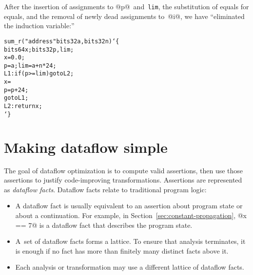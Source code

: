 \documentclass[blockstyle,preprint,natbib,nocopyrightspace]{sigplanconf}
\newcommand\lbr{\char`\{}
\newcommand\rbr{\char`\}}
\newcommand\secref[1]{Section~\ref{sec:#1}}
\newcommand\seclabel[1]{\label{sec:#1}}
\begin{document}
After the insertion of assignments to @p@~and~\texttt{lim}, the substitution
of equals for equals, and the removal of newly dead assignments
to~@i@, we have ``eliminated the induction variable:''
\begin{alltt}
sum_r("address" bits32 a, bits32 n) \lbr
     bits64 x; bits32 p, lim;
     x = 0.0;
     p = a; lim = a + n * 24;
 L1: if ({p >= lim}) goto L2;
     x = %fadd(x, bits64[{p}]);
     p = p + 24;
     goto L1;
 L2: return x;
\rbr
\end{alltt}

  


\section {Making dataflow simple}

\seclabel{making-simple}

\seclabel{create-analysis}

The goal of dataflow optimization is to compute valid
assertions, then use those assertions to justify code-improving
transformations.
%
%
Assertions are represented as
\emph{dataflow facts}.
Dataflow facts relate to
 traditional 
program logic:
\begin{itemize}
\item
A dataflow fact is usually equivalent to an assertion about program state or
about a continuation.
For example, in \secref{constant-propagation}, @x == 7@ is a dataflow
fact that describes the program state. 


\item
A~set of dataflow facts forms a lattice.
To ensure that analysis terminates,
it is enough if
no fact has more than finitely many distinct facts above it.
\item
Each analysis or transformation may use a different lattice of
dataflow facts.
\end{itemize}
\end{document}
